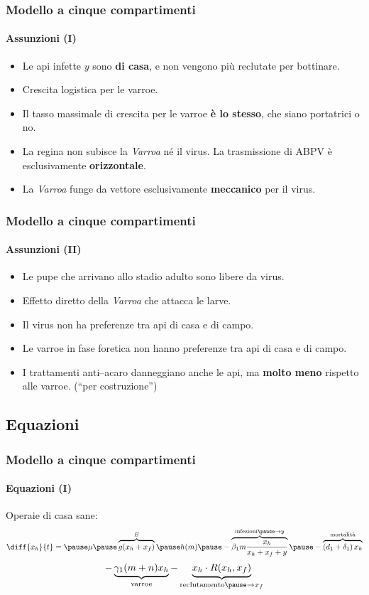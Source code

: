 \documentclass[]{beamer}
\begin{document}
\begin{frame}
    \frametitle{Modello a cinque compartimenti}
    \framesubtitle{Assunzioni (I)}

    \begin{itemize}
        \item \pause Le api infette $y$ sono \textbf{di casa}, \pause
            e non vengono più reclutate per bottinare.
        \item \pause Crescita logistica per le varroe.
        \item \pause Il tasso massimale di crescita per le varroe \textbf{è lo stesso},
            che siano portatrici o no.
        \item \pause La regina non subisce la \emph{Varroa} né il virus.
            \pause La trasmissione di ABPV è esclusivamente \textbf{orizzontale}.
        \item \pause La \emph{Varroa} funge da vettore esclusivamente \textbf{meccanico} per il virus.
    \end{itemize}
\end{frame}

\begin{frame}
    \frametitle{Modello a cinque compartimenti}
    \framesubtitle{Assunzioni (II)}

    \begin{itemize}
        \item Le pupe che arrivano allo stadio adulto sono libere da virus.
        \item \pause Effetto diretto della \emph{Varroa} che attacca le larve.
        \item \pause Il virus non ha preferenze tra api di casa e di campo.
        \item \pause Le varroe in fase foretica non hanno preferenze tra api di casa e di campo.
        \item \pause I trattamenti anti--acaro danneggiano anche le api,
            ma \textbf{molto meno} rispetto alle varroe. \pause (``per costruzione'')
    \end{itemize}
\end{frame}

\subsection{Equazioni}

\begin{frame}
    \frametitle{Modello a cinque compartimenti}
    \framesubtitle{Equazioni (I)}

    Operaie di casa sane:
    $$ \diff{x_h}{t} = \pause \mu \pause \overbrace{ g( x_h + x_f ) }^{E} %
        \pause h(m) \pause - \overbrace{ \beta_1 m \frac{x_h}{x_h + x_f + y} }^{\text{infezioni} \pause \to y} %
        \pause - \overbrace{ \left( d_1 + \delta_1 \right) x_h }^{\text{mortalità}} $$
    \pause
    $$ - \underbrace{ \gamma_1 (m+n) x_h }_{\text{varroe}} %
        - \underbrace{ x_h \cdot R(x_h, x_f) }_{\text{reclutamento} \pause \to x_f}  $$
\end{frame}
\end{document}
